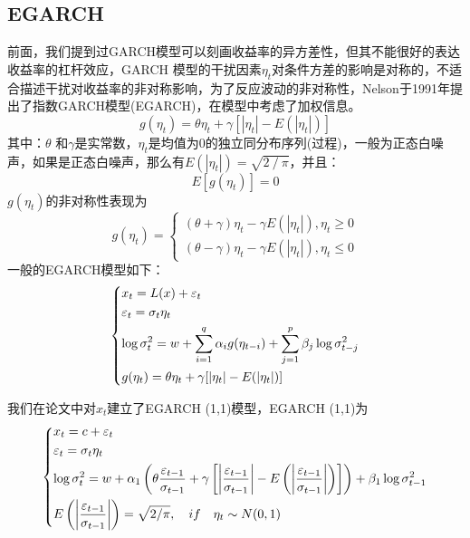     \subsection{EGARCH}
        前面，我们提到过GARCH模型可以刻画收益率的异方差性，但其不能很好的表达收益率的杠杆效应，GARCH 模型的干扰因素$\eta_t$对条件方差的影响是对称的，不适合描述干扰对收益率的非对称影响，为了反应波动的非对称性，Nelson于1991年提出了指数GARCH模型(EGARCH)，在模型中考虑了加权信息。
        \[g({\eta _t}) = \theta {\eta _t} + \gamma [\left| {{\eta _t}} \right| - E(\left| {{\eta _t}} \right|)]\]
        其中：$\theta$ 和$\gamma $是实常数，$\eta_t$是均值为0的独立同分布序列(过程)，一般为正态白噪声，如果是正态白噪声，那么有$E\left(|\eta_t |\right)=\sqrt{2⁄\pi}$，并且：
        \[E\left[ {g\left( {{\eta _t}} \right)} \right] = 0\]
        $g(\eta_t )$的非对称性表现为
        \[g\left( {{\eta _t}} \right) = \left\{ \begin{array}{l}
        \left( {\theta  + \gamma } \right){\eta _t} - \gamma E\left( {\left| {{\eta _t}} \right|} \right),{\eta _t} \ge 0\\
        \left( {\theta  - \gamma } \right){\eta _t} - \gamma E\left( {\left| {{\eta _t}} \right|} \right),{\eta _t} \le 0
        \end{array} \right.\]
        一般的EGARCH模型如下：
        \begin{equation*}
        \centering
        \left\{\begin{lgathered}
        {x_t} = L(x) + {\varepsilon _t}\\
        {\varepsilon _t} = {\sigma _t}{\eta _t}\\
        \log \sigma _t^2 = w + \sum\limits_{i = 1}^q {{\alpha _i}g({\eta _{t - i}})}  + \sum\limits_{j = 1}^p {{\beta _j}\log \sigma _{t - j}^2} \\
        g({\eta _t}) = \theta {\eta _t} + \gamma [\left| {{\eta _t}} \right| - E(\left| {{\eta _t}} \right|)]
        \end{lgathered} \right.
        \end{equation*}
        \par
        我们在论文中对$x_t$建立了EGARCH (1,1)模型，EGARCH (1,1)为
        \begin{equation*}
        \centering
        \left\{\begin{lgathered}
        {x_t} = c + {\varepsilon _t}\\
        {\varepsilon _t} = {\sigma _t}{\eta _t}\\
        \log \sigma _t^2 = w + {\alpha _1}\left(\theta \frac{{{\varepsilon _{t - 1}}}}{{{\sigma _{t - 1}}}} + \gamma \left[\left| {\frac{{{\varepsilon _{t - 1}}}}{{{\sigma _{t - 1}}}}} \right| - E\left(\left| {\frac{{{\varepsilon _{t - 1}}}}{{{\sigma _{t - 1}}}}} \right|\right)\right]\right) + {\beta _1}\log \sigma _{t - 1}^2\\
        E\left(\left| {\frac{{{\varepsilon _{t - 1}}}}{{{\sigma _{t - 1}}}}} \right|\right) = \sqrt {2/\pi } ,\quad if\quad {\eta _t} \sim N(0,1)
         \end{lgathered} \right.
         \end{equation*}
